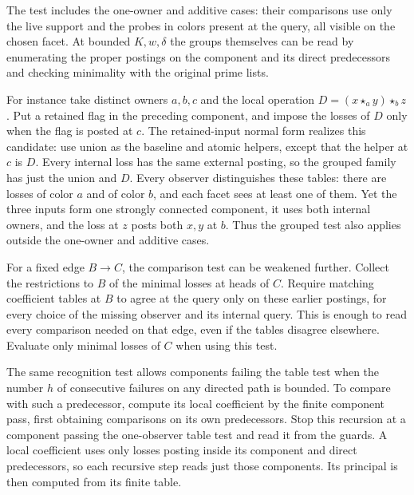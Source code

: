 The test includes the one-owner and additive cases:
their comparisons use only the live support and
the probes in colors present at the query, all
visible on the chosen facet. At bounded $K,w,\delta$
the groups themselves can be read
by enumerating the proper postings on the
component and its direct predecessors and checking
minimality with the original prime lists.

For instance take distinct owners $a,b,c$ and
the local operation $D=(x\star_a y)\star_b z$.
Put a retained flag in the preceding component,
and impose the losses of $D$ only when the flag
is posted at $c$. The retained-input normal form
realizes this candidate: use union as the baseline
and atomic helpers, except that the helper at $c$
is $D$. Every internal loss has the same external
posting, so the grouped family has just the union
and $D$. Every observer distinguishes these tables:
there are losses of color $a$ and of color $b$,
and each facet sees at least one of them. Yet the
three inputs form one strongly connected component,
it uses both internal owners, and the loss at $z$
posts both $x,y$ at $b$. Thus the grouped test
also applies outside the one-owner and additive
cases.

For a fixed edge $B\to C$, the comparison test
can be weakened further. Collect the restrictions
to $B$ of the minimal losses at heads of $C$.
Require matching coefficient tables at $B$ to
agree at the query only on these earlier postings,
for every choice of the missing observer and its
internal query. This is enough to read every
comparison needed on that edge, even if the
tables disagree elsewhere. Evaluate only minimal
losses of $C$ when using this test.

The same recognition test allows components failing
the table test when the number $h$ of consecutive
failures on any directed path is bounded. To compare
with such a predecessor, compute its local
coefficient by the finite component pass, first
obtaining comparisons on its own predecessors.
Stop this recursion at a component passing the
one-observer table test and read it from the guards. A local
coefficient uses only losses posting inside its
component and direct predecessors, so each
recursive step reads just those components. Its
principal is then computed from its finite table.

